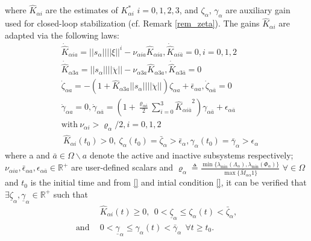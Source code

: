 \documentclass[letterpaper, 10 pt, conference]{ieeeconf}  %
\begin{document}
where $\hat{K}_{\alpha i}$ are the estimates of $K_{\alpha i}^*$ $i=0,1,2,3$, and $\zeta_{\alpha}$, $\gamma_{\alpha}$ are auxiliary gain used for closed-loop stabilization (cf. Remark \ref{rem_zeta}). The gains $\hat{K}_{\alpha i}$ are adapted via the following laws:
\begin{subequations}\label{adaptive_law_alpha}
\begin{align}
&\dot{\hat{K}}_{\alpha ia} = ||s_{\alpha}||||\xi||^i - \nu_{\alpha ia} \hat{K}_{\alpha ia}, \dot{\hat{K}}_{\alpha i\bar{a}} = 0,  i = 0,1,2
 \\
&\dot{\hat{K}}_{\alpha3a} =  ||s_{\alpha}||||\ddot{\chi}|| - \nu_{\alpha3a} \hat{K}_{\alpha3a}, \dot{\hat{K}}_{\alpha3\bar{a}} = 0\\
&\dot{\zeta}_{\alpha a} = -(1 + \hat{K}_{\alpha3a}||s_{\alpha}||||\ddot{\chi}||)\zeta_{\alpha a} + \bar{\epsilon}_{\alpha a}, \dot{\zeta}_{\alpha \bar{a}} = 0    \\ \label{zeta1}
& \dot{\gamma}_{\alpha a} = 0,  \dot{\gamma}_{\alpha\bar{a}} = \left(1+ \frac{\varrho_{\alpha\bar{a}}}{2}\sum \limits_{i=0}^{3} {\hat{K}_{\alpha i\bar{a}}}^2 \right) \gamma_{\alpha \bar{a}} +\epsilon_{\alpha \bar{a}} \\
& \text{with}~ \nu_{\alpha i} > \varrho_{\alpha}/2, i = 0,1,2\\
&~\hat{K}_{\alpha i} (t_0) > 0, ~\zeta_{\alpha } (t_0)  = \bar{\zeta}_{\alpha } > \bar{\epsilon}_{\alpha }, \gamma_{\alpha } (t_0) = \bar{\gamma}_{\alpha } > \epsilon_{\alpha }
\end{align}
\end{subequations}
where a and $\bar{a} \in \Omega \backslash {a}$ denote the active and inactive subsystems respectively; $\nu_{\alpha ia},\bar{\epsilon}_{\alpha a}, \epsilon_{\alpha\bar{a}}  \in\mathbb{R}^{+}$ are user-defined scalars and $\varrho_{\alpha} \triangleq \frac{\min \lbrace \lambda_{\min}(  \Lambda_{{\alpha}} ), \lambda_{\min}( \Phi_{{\alpha}} ) \rbrace}{\max \lbrace \bar{M}_{\alpha\alpha} 1 \rbrace}$ $\forall  \in \Omega$ and $t_0$ is the initial time and from \ref{} and intial condition \ref{}, it can be verified that $\exists \underline{\zeta}_{\alpha }, \underline{\gamma}_{\alpha } \in \mathbb{R}^{+}$ such that
\begin{subequations}
\begin{align}
&\hat{K}_{\alpha i}(t) \geq 0, ~~ 0 < \underline{\zeta}_{\alpha } \leq \zeta_{\alpha } (t) <  \bar{\zeta}_{\alpha }, \nonumber \\
\text{and}~~ & 0 < \underline{\gamma}_{\alpha } \leq \gamma_{\alpha } (t) <  \bar{\gamma}_{\alpha } ~~ \forall t \geq t_0.
\end{align}
\end{subequations}
\end{document}
